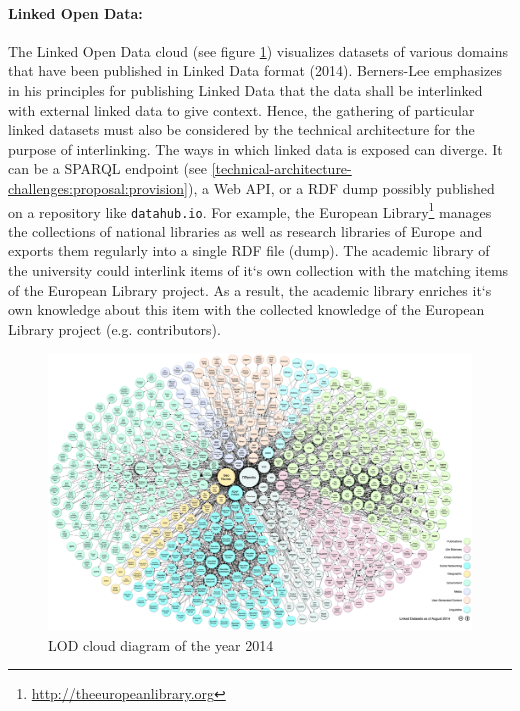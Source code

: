 \documentclass{article}
\begin{document}
\paragraph{Linked Open Data:} The Linked Open Data cloud (see figure \ref{fig:lod-cloud-diagram}) visualizes datasets of various domains that have been published in Linked Data format (2014)\cite{_linking_????}. Berners-Lee emphasizes in his principles for publishing Linked Data that the data shall be interlinked with external linked data to give context. Hence, the gathering of particular linked datasets must also be considered by the technical architecture for the purpose of interlinking. The ways in which linked data is exposed can diverge. It can be a SPARQL endpoint (see \ref{technical-architecture-challenges:proposal:provision}), a Web API, or a RDF dump possibly published on a repository like \texttt{datahub.io}. For example, the European Library\footnote{\url{http://theeuropeanlibrary.org}} manages the collections of national libraries as well as research libraries of Europe and exports them regularly into a single RDF file (dump). The academic library of the university could interlink items of it`s own collection with the matching items of the European Library project. As a result, the academic library enriches it`s own knowledge about this item with the collected knowledge of the European Library project (e.g. contributors).

\begin{figure}[t]
\centering \includegraphics*[width=1.0\columnwidth]{images/technical-architecture/lod-cloud_colored_1000px.png}
\caption{LOD cloud diagram of the year 2014}
\label{fig:lod-cloud-diagram}
\end{figure}
\end{document}
